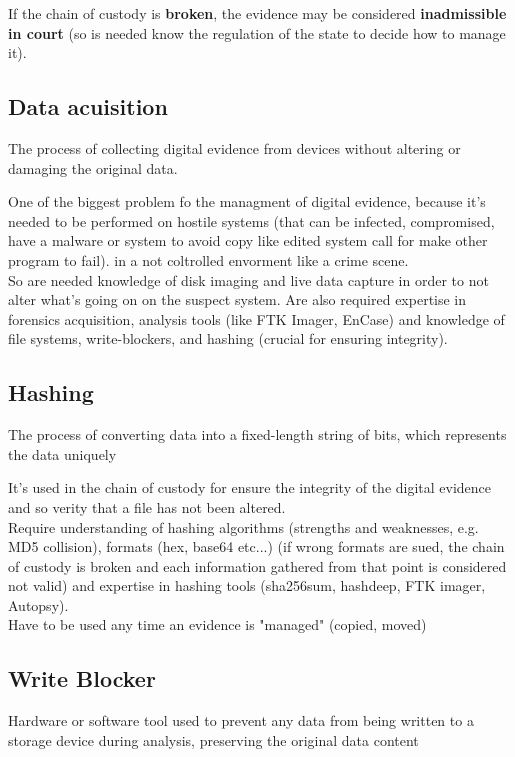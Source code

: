 If the chain of custody is \textbf{broken}, the evidence may be considered \textbf{inadmissible in court}
(so is needed know the regulation of the state to decide how to manage it).

\subsection{Data acuisition}
\begin{boxH}
  The process of collecting digital evidence from devices
  without altering or damaging the original data.
\end{boxH}

One of the biggest problem fo the managment of digital evidence, because it's needed to be performed
on hostile systems (that can be infected, compromised, have a malware or system to avoid copy
like edited system call for make other program to fail). in a not coltrolled envorment like a crime scene. \\
So are needed knowledge of disk imaging and live data capture in order to not alter what's going on
on the suspect system. Are also required expertise in forensics acquisition, analysis
tools (like FTK Imager, EnCase) and knowledge of file systems, write-blockers, and hashing
(crucial for ensuring integrity).

\subsection{Hashing}
\begin{boxH}
  The process of converting data into a fixed-length string of
  bits, which represents the data uniquely
\end{boxH}

It's used in the chain of custody for ensure the integrity of the digital evidence and so verity
that a file has not been altered. \\
Require understanding of hashing algorithms (strengths and
weaknesses, e.g. MD5 collision), formats
(hex, base64 etc...) (if wrong formats are sued, the chain of custody is broken and each information
gathered from that point is considered not valid)
and expertise in hashing tools (sha256sum, hashdeep, FTK imager, Autopsy). \\

Have to be used any time an evidence is "managed" (copied, moved)

\subsection{Write Blocker}
\begin{boxH}
  Hardware or software tool used to prevent any data from
  being written to a storage device during analysis, preserving
  the original data content
\end{boxH}

